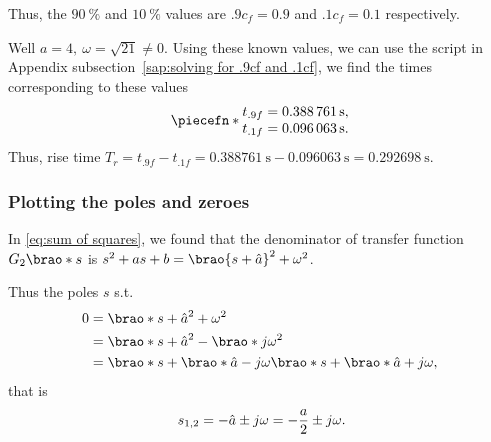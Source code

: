\documentclass[12pt]{article}
\DeclarePairedDelimiter\brao()%
\DeclarePairedDelimiter\piecefn\{.
\begin{document}
\begin{enumerate}[(a)]
        Thus, the $\SI{90}\percent$ and $\SI{10}\percent$ values are $.9c_f = 0.9$ and $.1c_f = 0.1$ respectively.

        Well $a = 4,\ \omega = \sqrt{21} \not= 0$.
        Using these known values, we can use the script in Appendix subsection~\ref{sap:solving for .9cf and .1cf}, we find the times corresponding to these values
        \begin{equation}
            \piecefn*{
                \begin{array}{@{}l@{}}
                    t_{.9f} = \SI{0.388761}\second, \\*
                    t_{.1f} = \SI{0.096063}\second. \\*
                \end{array}
            }
        \end{equation}
        Thus, rise time $T_r = t_{.9f} - t_{.1f} = \SI{0.388761}\second - \SI{0.096063}\second = \SI{0.292698}\second$.

        \subsubsection{Plotting the poles and zeroes}

        In \eqref{eq:sum of squares}, we found that the denominator of transfer function $G_2\brao*s$ is $s^2 + as + b = \brao{s + \hat{a}}^2 + \omega^2$.

        Thus the poles $s$ s.t.
        \begin{equation}
            \begin{aligned}
                0 &{}= \brao*{s + \hat{a}}^2 + \omega^2
            \\*
                  &{}= \brao*{s + \hat{a}}^2 - \brao*{j\omega}^2
            \\*
                  &{}= \brao*{s + \brao*{\hat{a} - j\omega}}\brao*{s + \brao*{\hat{a} + j\omega}},
            \\*
            \end{aligned}
        \end{equation}
        that is
        \begin{equation}\label{eq:poles}
            \begin{aligned}
                s_{1,2} = -\hat{a} \pm j\omega
                = -\frac{a}2 \pm j\omega
                \rlap.
            \end{aligned}
        \end{equation}


\end{enumerate}
\end{document}
